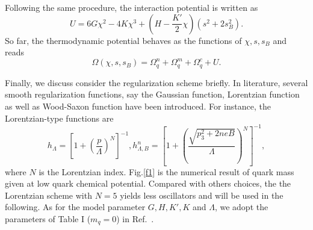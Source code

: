 \documentclass[prd, showpacs,nofootinbib,amsmath,amssymb,12pt]{revtex4}
\begin{document}
Following the same procedure, the interaction potential is written as
\begin{equation}
U=6G\chi^2-4K\chi^3+(H-\frac{K'}{2}\chi)(s^2+2s^2_B).
\end{equation}
So far, the  thermodynamic potential behaves as the functions of $\chi,s,s_B$ and reads
\begin{equation}
\label{finaleq}
\Omega(\chi,s,s_B)=\Omega^n_q+\Omega^m_q+\Omega^c_q+U.
\end{equation}

Finally, we discuss consider the regularization scheme briefly.
In literature, several smooth regularization functions, say the Gaussian function\cite{noronha2007color}, Lorentzian function\cite{Frasca2011Magnetic} as well as Wood-Saxon function\cite{fayazbakhsh2010color} have been introduced. 
For instance, the Lorentzian-type functions are 
\begin{equation}
  h_{\Lambda} = [1+(\frac{p}{\Lambda})^N]^{-1},   h^n_{\Lambda,B}=[1+(\frac{\sqrt{p_3^2 + 2neB}}{\Lambda})^N]^{-1},
  \label{eq:regulator}
\end{equation}
where $N$ is the Lorentzian index.
Fig.\ref{f1} is the numerical result of quark mass given at low quark chemical potential. 
Compared with others choices, the the Lorentzian scheme with $N=5$ yields less oscillators and will be used in the following.
As for the model parameter $G, H, K',K$ and $\Lambda$, we adopt the parameters of Table I ($m_q=0$) in Ref.~\cite{abuki2010nambu}.
\end{document}
